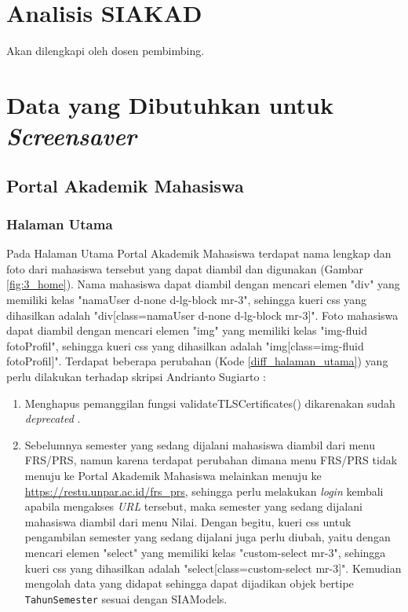     
\section{Analisis SIAKAD}
Akan dilengkapi oleh dosen pembimbing.


\section{Data yang Dibutuhkan untuk \textit{Screensaver}}

\subsection{Portal Akademik Mahasiswa}

\subsubsection{Halaman Utama}
Pada Halaman Utama Portal Akademik Mahasiswa terdapat nama lengkap dan foto dari mahasiswa tersebut yang dapat diambil dan digunakan (Gambar \ref{fig:3_home}). Nama mahasiswa dapat diambil dengan mencari elemen "div" yang memiliki kelas "namaUser d-none d-lg-block mr-3", sehingga kueri css yang dihasilkan adalah "div[class=namaUser d-none d-lg-block mr-3]". Foto mahasiswa dapat diambil dengan mencari elemen "img" yang memiliki kelas "img-fluid fotoProfil", sehingga kueri css yang dihasilkan adalah "img[class=img-fluid fotoProfil]".
Terdapat beberapa perubahan (Kode \ref{diff_halaman_utama}) yang perlu dilakukan terhadap skripsi Andrianto Sugiarto \cite{ifstupor}: 

\begin{enumerate}
    \item Menghapus pemanggilan fungsi validateTLSCertificates() dikarenakan sudah \textit{deprecated} \cite{jsoup}.
    \item Sebelumnya semester yang sedang dijalani mahasiswa diambil dari menu FRS/PRS, namun karena terdapat perubahan dimana menu FRS/PRS tidak menuju ke Portal Akademik Mahasiswa melainkan menuju ke \url{https://restu.unpar.ac.id/frs_prs}, sehingga perlu melakukan \textit{login} kembali apabila mengakses \textit{URL} tersebut, maka semester yang sedang dijalani mahasiswa diambil dari menu Nilai. Dengan begitu, kueri css untuk pengambilan semester yang sedang dijalani juga perlu diubah, yaitu dengan mencari elemen "select" yang memiliki kelas "custom-select mr-3", sehingga kueri css yang dihasilkan adalah "select[class=custom-select mr-3]". Kemudian mengolah data yang didapat sehingga dapat dijadikan objek bertipe \texttt{TahunSemester} sesuai dengan SIAModels.
\end{enumerate}

